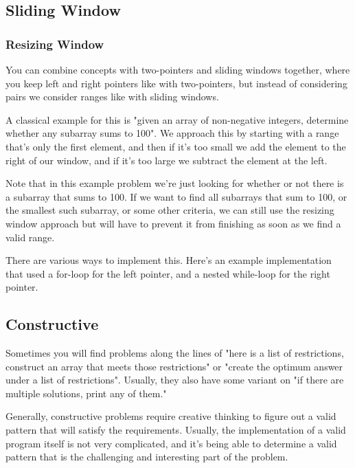 \subsection{Sliding Window}



\subsubsection{Resizing Window}

You can combine concepts with two-pointers and sliding windows together, where you keep left and right pointers like with two-pointers, but instead of considering pairs we consider ranges like with sliding windows.

A classical example for this is "given an array of non-negative integers, determine whether any subarray sums to 100". We approach this by starting with a range that's only the first element, and then if it's too small we add the element to the right of our window, and if it's too large we subtract the element at the left.

Note that in this example problem we're just looking for whether or not there is a subarray that sums to 100. If we want to find all subarrays that sum to 100, or the smallest such subarray, or some other criteria, we can still use the resizing window approach but will have to prevent it from finishing as soon as we find a valid range.

There are various ways to implement this. Here's an example implementation that used a for-loop for the left pointer, and a nested while-loop for the right pointer.


\subsection{Constructive}

Sometimes you will find problems along the lines of "here is a list of restrictions, construct an array that meets those restrictions" or "create the optimum answer under a list of restrictions". Usually, they also have some variant on "if there are multiple solutions, print any of them."

Generally, constructive problems require creative thinking to figure out a valid pattern that will satisfy the requirements. Usually, the implementation of a valid program itself is not very complicated, and it's being able to determine a valid pattern that is the challenging and interesting part of the problem.

